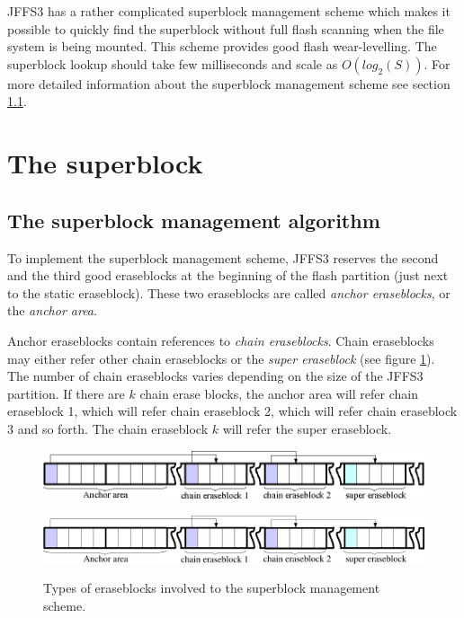 \documentclass[12pt,a4paper,oneside,titlepage]{article}
\begin{document}
JFFS3 has a rather complicated superblock management scheme which makes it
possible to quickly find the superblock without full flash scanning when the
file system is being mounted. This scheme provides good flash
\mbox{wear-levelling}. The superblock lookup should take few milliseconds and
scale as $O(log_2(S))$. For more detailed information about the superblock
management scheme see section \ref{ref_SectionSBAlg}.

%
%
\section{The superblock}

%
%
\subsection{The superblock management algorithm} \label{ref_SectionSBAlg}

To implement the superblock management scheme, JFFS3 reserves the second and
the third good eraseblocks at the beginning of the flash partition (just next
to the static eraseblock). These two eraseblocks are called \emph{anchor
eraseblocks}, or the \emph{anchor area}.

Anchor eraseblocks contain references to \emph{chain eraseblocks}. Chain
eraseblocks may either refer other chain eraseblocks or the \emph{super
eraseblock} (see figure \ref{ref_FigureSB_01}). The number of chain eraseblocks
varies depending on the size of the JFFS3 partition. If there are $k$ chain
erase blocks, the anchor area will refer chain eraseblock 1, which will refer
chain eraseblock 2, which will refer chain eraseblock 3 and so forth. The chain
eraseblock $k$ will refer the super eraseblock.

%
%
\begin{figure}[h]
\begin{center}
\begin{htmlonly}
\includegraphics{pics/sb-01.png}
\end{htmlonly}
\includegraphics[width=159mm,height=21mm]{pics/sb-01.pdf}
\end{center}
\caption{Types of eraseblocks involved to the superblock management scheme.}
\label{ref_FigureSB_01}
\end{figure}
\end{document}
